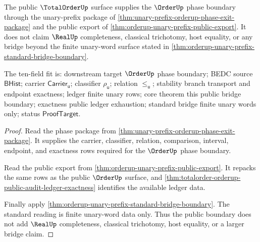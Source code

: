 \begin{theorem}
\label{thm:totalorder-public-bridge-boundary}
The public $\TotalOrderUp$ surface supplies the $\OrderUp$ phase boundary
through the unary-prefix package of
\autoref{thm:unary-prefix-orderup-phase-exit-package} and the public export of
\autoref{thm:orderup-unary-prefix-public-export}. It does not claim
$\RealUp$ completeness, classical trichotomy, host equality, or any bridge
beyond the finite unary-word surface stated in
\autoref{thm:orderup-unary-prefix-standard-bridge-boundary}.

The ten-field fit is: downstream target $\OrderUp$ phase boundary; BEDC source
$\mathsf{BHist}$; carrier $\mathsf{Carrier}_{\mathsf{u}}$; classifier
$\rho_{\mathsf{u}}$; relation $\le_{\mathsf{u}}$; stability branch transport
and endpoint exactness; ledger finite unary rows; core theorem this public
bridge boundary; exactness public ledger exhaustion; standard bridge finite
unary words only; status $\mathsf{ProofTarget}$.
\end{theorem}
\begin{proof}
Read the phase package from
\autoref{thm:unary-prefix-orderup-phase-exit-package}. It supplies the
carrier, classifier, relation, comparison, interval, endpoint, and exactness
rows required for the $\OrderUp$ phase boundary.

Read the public export from \autoref{thm:orderup-unary-prefix-public-export}.
It repacks the same rows as the public $\OrderUp$ surface, and
\autoref{thm:totalorder-orderup-public-audit-ledger-exactness} identifies the
available ledger data.

Finally apply \autoref{thm:orderup-unary-prefix-standard-bridge-boundary}. The
standard reading is finite unary-word data only. Thus the public boundary
does not add $\RealUp$ completeness, classical trichotomy, host equality, or a
larger bridge claim.
\end{proof}
